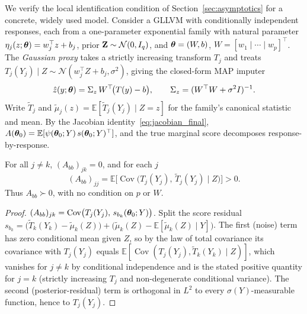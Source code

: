 \documentclass[twoside,11pt]{article}
\begin{document}
We verify the local identification condition of Section~\ref{sec:asymptotics} for a concrete, widely used model. Consider a GLLVM with conditionally independent responses, each from a one-parameter exponential family with natural parameter $\eta_j(z;{\bm{\theta}})=w_j^\top z+b_j$, prior ${\bf Z}\sim\mathcal N(0,I_q)$, and ${\bm{\theta}}=(W,b)$, $W=[w_1\mid\cdots\mid w_p]^\top$. The \emph{Gaussian proxy} takes a strictly increasing transform $T_j$ and treats $T_j(Y_j)\mid Z\sim\mathcal N(w_j^\top Z+b_j,\sigma^2)$, giving the closed-form MAP imputer
\[
\hat z(y;{\bm{\theta}})=\Sigma_z\,W^\top\!\big(T(y)-b\big),\qquad \Sigma_z=(W^\top W+\sigma^2 I)^{-1}.
\]
Write $\tilde T_j$ and $\tilde\mu_j(z)=\mathbb E[\tilde T_j(Y_j)\mid Z=z]$ for the family's canonical statistic and mean. By the Jacobian identity~\eqref{eq:jacobian_final}, $A({\bm{\theta}}_0)=\mathbb E[\psi({\bm{\theta}}_0;Y)\,s({\bm{\theta}}_0;Y)^\top]$, and the true marginal score decomposes response-by-response.

\begin{lemma}
\label{lem:bblock}
For all $j\neq k$, $(A_{bb})_{jk}=0$, and for each $j$
\[
(A_{bb})_{jj}=\mathbb E\big[\operatorname{Cov}\!\big(T_j(Y_j),\,\tilde T_j(Y_j)\mid Z\big)\big]>0 .
\]
Thus $A_{bb}\succ0$, with no condition on $p$ or $W$.
\end{lemma}
\begin{proof}
$(A_{bb})_{jk}=\operatorname{Cov}\!\big(T_j(Y_j),\,s_{b_k}({\bm{\theta}}_0;Y)\big)$. Split the score residual $s_{b_k}=\big(\tilde T_k(Y_k)-\tilde\mu_k(Z)\big)+\big(\tilde\mu_k(Z)-\mathbb E[\tilde\mu_k(Z)\mid Y]\big)$. The first (noise) term has zero conditional mean given $Z$, so by the law of total covariance its covariance with $T_j(Y_j)$ equals $\mathbb E[\operatorname{Cov}(T_j(Y_j),\tilde T_k(Y_k)\mid Z)]$, which vanishes for $j\neq k$ by conditional independence and is the stated positive quantity for $j=k$ (strictly increasing $T_j$ and non-degenerate conditional variance). The second (posterior-residual) term is orthogonal in $L^2$ to every $\sigma(Y)$-measurable function, hence to $T_j(Y_j)$.
\end{proof}
\end{document}
